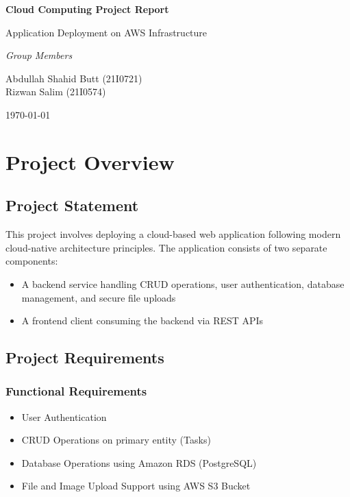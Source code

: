 \documentclass[12pt,a4paper]{article}
\begin{document}
\begin{titlepage}
    \centering
    \vspace*{1cm}
    {\Huge\bfseries Cloud Computing Project Report\par}
    \vspace{1cm}
    {\Large Application Deployment on AWS Infrastructure\par}
    \vspace{1.5cm}
    {\Large\itshape Group Members\par}
    \vspace{0.5cm}
    Abdullah Shahid Butt (21I0721)\\
    Rizwan Salim (21I0574)
    \vfill
    {\large \today\par}
\end{titlepage}

\tableofcontents
\newpage

\section{Project Overview}

\subsection{Project Statement}
This project involves deploying a cloud-based web application following modern cloud-native architecture principles. The application consists of two separate components:
\begin{itemize}
    \item A backend service handling CRUD operations, user authentication, database management, and secure file uploads
    \item A frontend client consuming the backend via REST APIs
\end{itemize}

\subsection{Project Requirements}

\subsubsection{Functional Requirements}
\begin{itemize}
    \item User Authentication
    \item CRUD Operations on primary entity (Tasks)
    \item Database Operations using Amazon RDS (PostgreSQL)
    \item File and Image Upload Support using AWS S3 Bucket
\end{itemize}
\end{document}
